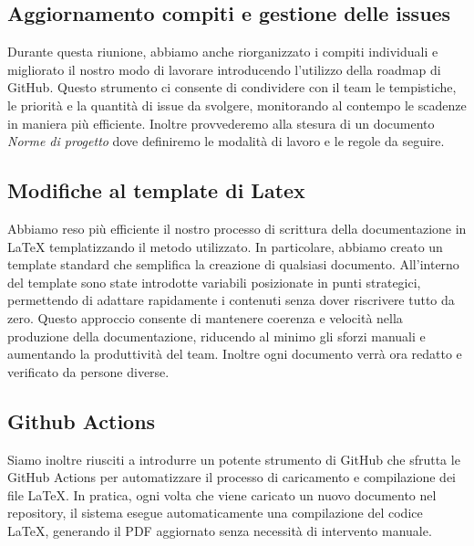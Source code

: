 \documentclass{article}
\begin{document}
\subsection{Aggiornamento compiti e gestione delle issues}
Durante questa riunione, abbiamo anche riorganizzato i compiti individuali e migliorato il nostro modo di lavorare introducendo l'utilizzo della roadmap di GitHub. Questo strumento ci consente di condividere con il team le tempistiche, le priorità e la quantità di issue da svolgere, monitorando al contempo le scadenze in maniera più efficiente.
Inoltre provvederemo alla stesura di un documento \textit{Norme di progetto} dove definiremo le modalità di lavoro e le regole da seguire.

\subsection{Modifiche al template di Latex}
Abbiamo reso più efficiente il nostro processo di scrittura della documentazione in LaTeX templatizzando il metodo utilizzato. In particolare, abbiamo creato un template standard che semplifica la creazione di qualsiasi documento. All'interno del template sono state introdotte variabili posizionate in punti strategici, permettendo di adattare rapidamente i contenuti senza dover riscrivere tutto da zero. Questo approccio consente di mantenere coerenza e velocità nella produzione della documentazione, riducendo al minimo gli sforzi manuali e aumentando la produttività del team.
Inoltre ogni documento verrà ora redatto e verificato da persone diverse. 

\subsection{Github Actions}
Siamo inoltre riusciti a introdurre un potente strumento di GitHub che sfrutta le GitHub Actions per automatizzare il processo di caricamento e compilazione dei file LaTeX. In pratica, ogni volta che viene caricato un nuovo documento nel repository, il sistema esegue automaticamente una compilazione del codice LaTeX, generando il PDF aggiornato senza necessità di intervento manuale.
\end{document}
